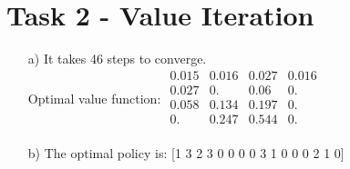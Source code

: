 \documentclass[a4paper]{article}
\begin{document}
\section*{Task 2 - Value Iteration}
\begin{enumerate}
	\item[a)] It takes 46 steps to converge. \\
	Optimal value function:
	$
	\begin{matrix} 
		0.015 & 0.016 & 0.027 & 0.016 \\
		0.027 & 0.    & 0.06  & 0.    \\
		0.058 & 0.134 & 0.197 & 0.    \\
		0.    & 0.247 & 0.544 & 0.    \\ 
	\end{matrix}
	$
	\item[b)] The optimal policy is: [1 3 2 3 0 0 0 0 3 1 0 0 0 2 1 0]
\end{enumerate}
\end{document}
